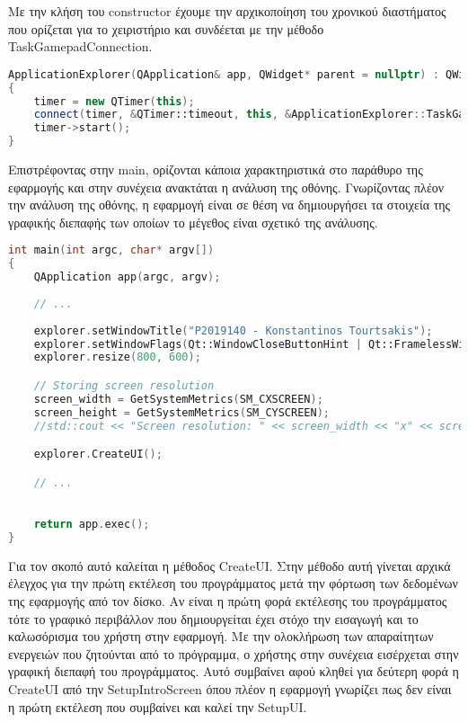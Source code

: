 Με την κλήση του constructor έχουμε την αρχικοποίηση του χρονικού διαστήματος που ορίζεται για το
χειριστήριο και συνδέεται με την μέθοδο TaskGamepadConnection.

\begin{lstlisting}[language=C++, style=cppstyle]
ApplicationExplorer(QApplication& app, QWidget* parent = nullptr) : QWidget(parent), app(app)
{
    timer = new QTimer(this);
    connect(timer, &QTimer::timeout, this, &ApplicationExplorer::TaskGamepadConnection);
    timer->start();
}
\end{lstlisting}

Επιστρέφοντας στην main, ορίζονται κάποια χαρακτηριστικά στο παράθυρο της εφαρμογής και στην συνέχεια
ανακτάται η ανάλυση της οθόνης. Γνωρίζοντας πλέον την ανάλυση της οθόνης, η εφαρμογή είναι σε θέση να
δημιουργήσει τα στοιχεία της γραφικής διεπαφής των οποίων το μέγεθος είναι σχετικό της ανάλυσης.

\begin{lstlisting}[language=C++, style=cppstyle]
int main(int argc, char* argv[]) 
{
    QApplication app(argc, argv);
    
    // ...
    
    explorer.setWindowTitle("P2019140 - Konstantinos Tourtsakis");
    explorer.setWindowFlags(Qt::WindowCloseButtonHint | Qt::FramelessWindowHint);
    explorer.resize(800, 600);

    // Storing screen resolution
    screen_width = GetSystemMetrics(SM_CXSCREEN);
    screen_height = GetSystemMetrics(SM_CYSCREEN);
    //std::cout << "Screen resolution: " << screen_width << "x" << screen_height << std::endl;

    explorer.CreateUI();

    // ...

    
    return app.exec();
}
\end{lstlisting}

Για τον σκοπό αυτό καλείται η μέθοδος CreateUI. Στην μέθοδο αυτή γίνεται αρχικά έλεγχος για την
πρώτη εκτέλεση του προγράμματος μετά την φόρτωση των δεδομένων της εφαρμογής από τον δίσκο. Αν
είναι η πρώτη φορά εκτέλεσης του προγράμματος τότε το γραφικό περιβάλλον που δημιουργείται έχει
στόχο την εισαγωγή και το καλωσόρισμα του χρήστη στην εφαρμογή. Με την ολοκλήρωση των απαραίτητων
ενεργειών που ζητούνται από το πρόγραμμα, ο χρήστης στην συνέχεια εισέρχεται στην γραφική διεπαφή
του προγράμματος. Αυτό συμβαίνει αφού κληθεί για δεύτερη φορά η CreateUI από την SetupIntroScreen
όπου πλέον η εφαρμογή γνωρίζει πως δεν είναι η πρώτη εκτέλεση που συμβαίνει και καλεί την SetupUI.

